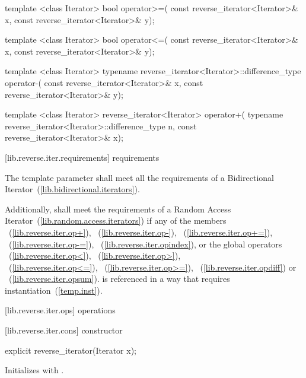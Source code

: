 \begin{codeblock}
{  template <class Iterator>
    bool operator>=(
      const reverse_iterator<Iterator>& x,
      const reverse_iterator<Iterator>& y);

  template <class Iterator>
    bool operator<=(
      const reverse_iterator<Iterator>& x,
      const reverse_iterator<Iterator>& y);

  template <class Iterator>
    typename reverse_iterator<Iterator>::difference_type operator-(
      const reverse_iterator<Iterator>& x,
      const reverse_iterator<Iterator>& y);

  template <class Iterator>
    reverse_iterator<Iterator> operator+(
      typename reverse_iterator<Iterator>::difference_type n,
      const reverse_iterator<Iterator>& x);
}
\end{codeblock}

[lib.reverse.iter.requirements]{ requirements}

\pnum
The template parameter
shall meet all the requirements of a Bidirectional Iterator~(\ref{lib.bidirectional.iterators}).

\pnum
Additionally,
shall meet the requirements of a Random Access Iterator~(\ref{lib.random.access.iterators})
if any of the members
~(\ref{lib.reverse.iter.op+}),
~(\ref{lib.reverse.iter.op-}),
~(\ref{lib.reverse.iter.op+=}),
~(\ref{lib.reverse.iter.op-=}),
~(\ref{lib.reverse.iter.opindex}),
or the global operators
~(\ref{lib.reverse.iter.op<}),
~(\ref{lib.reverse.iter.op>}),\\
~(\ref{lib.reverse.iter.op<=}),
~(\ref{lib.reverse.iter.op>=}),
~(\ref{lib.reverse.iter.opdiff})
or
~(\ref{lib.reverse.iter.opsum}).
is referenced in a way that requires instantiation~(\ref{temp.inst}).

[lib.reverse.iter.ops]{ operations}

[lib.reverse.iter.cons]{ constructor}

%

\begin{itemdecl}
explicit reverse_iterator(Iterator x);
\end{itemdecl}

\begin{itemdescr}
\pnum
\effects
Initializes
with .
\end{itemdescr}

